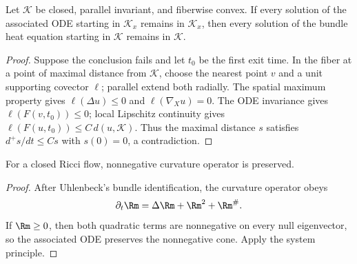 \begin{theorem}
\label{thm:chow-ii-system-wmp}
Let $\mathcal K$ be closed, parallel invariant, and fiberwise convex.  If every
solution of the associated ODE starting in $\mathcal K_x$ remains in
$\mathcal K_x$, then every solution of the bundle heat equation starting in
$\mathcal K$ remains in $\mathcal K$.
\end{theorem}
\begin{proof}
\sketch
{}
Suppose the conclusion fails and let $t_0$ be the first exit time.  In the fiber
at a point of maximal distance from $\mathcal K$, choose the nearest point $v$
and a unit supporting covector $\ell$; parallel extend both radially.  The
spatial maximum property gives $\ell(\Delta u)\le0$ and
$\ell(\nabla_Xu)=0$.  The ODE invariance gives $\ell(F(v,t_0))\le0$; local
Lipschitz continuity gives $\ell(F(u,t_0))\le C\,d(u,\mathcal K)$.  Thus the
maximal distance $s$ satisfies $d^+s/dt\le Cs$ with $s(0)=0$, a contradiction.
\end{proof}

\begin{theorem}
\label{thm:chow-ii-curvature-operator-preservation}
For a closed Ricci flow, nonnegative curvature operator is preserved.
\end{theorem}
\begin{proof}
\sketch
{}
After Uhlenbeck's bundle identification, the curvature operator obeys
\[
\partial_t\Rm=\Delta\Rm+\Rm^2+\Rm^\#.
\]
If $\Rm\ge0$, then both quadratic terms are nonnegative on every null
eigenvector, so the associated ODE preserves the nonnegative cone.  Apply the
system principle.
\end{proof}

